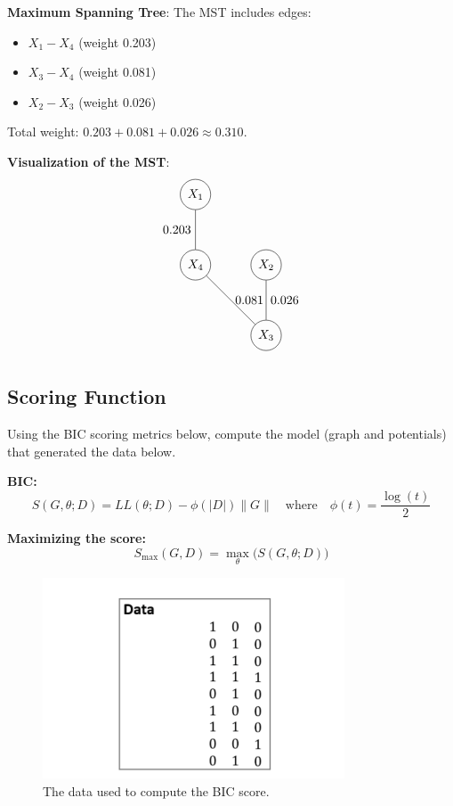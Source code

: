 \documentclass[a3paper,12pt]{extarticle} %
\begin{document}
\begin{enumerate}
\textbf{Maximum Spanning Tree}:
The MST includes edges:
\begin{itemize}
    \item \(X_1 - X_4\) (weight 0.203)
    \item \(X_3 - X_4\) (weight 0.081)
    \item \(X_2 - X_3\) (weight 0.026)
\end{itemize}
Total weight: \(0.203 + 0.081 + 0.026 \approx 0.310\).

\textbf{Visualization of the MST}:
\[
\begin{tikzpicture}
    \node[circle, draw] (X1) at (0,2) {$X_1$};
    \node[circle, draw] (X2) at (2,0) {$X_2$};
    \node[circle, draw] (X3) at (2,-2) {$X_3$};
    \node[circle, draw] (X4) at (0,0) {$X_4$};
    \draw (X1) -- (X4) node[midway, left] {0.203};
    \draw (X3) -- (X4) node[midway, right] {0.081};
    \draw (X2) -- (X3) node[midway, right] {0.026};
\end{tikzpicture}
\]




\end{enumerate}

\subsection{Scoring Function}
Using the BIC scoring metrics below, compute the model (graph and potentials) that generated the data below. 

\textbf{BIC:}
\[
S(G, \theta; D) = LL(\theta; D) - \phi(|D|)\|G\| \quad \text{where} \quad \phi(t) = \frac{\log(t)}{2}
\]

\textbf{Maximizing the score:}
\[
S_{\text{max}}(G, D) = \max_{\theta} \big(S(G, \theta; D)\big)
\]

\begin{figure}[H]
\centering
\includegraphics[width=0.8\textwidth]{q2.png}
\caption{The data used to compute the BIC score.}
\label{fig:data}
\end{figure}
\end{document}
